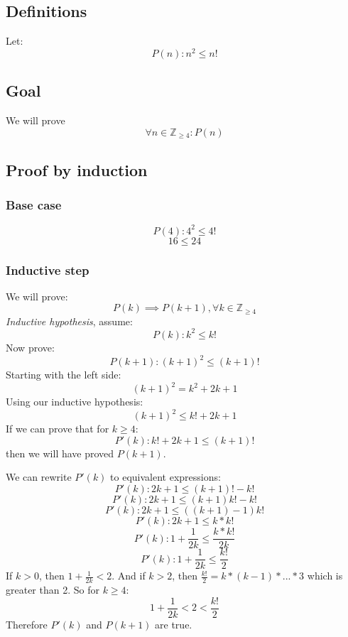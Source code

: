 \documentclass{article}
\begin{document}
\subsection{Definitions}
Let:
\begin{equation}
P(n): n^2 \leq n!
\end{equation}

\subsection{Goal}
We will prove
\begin{equation}
\forall n \in \mathbb Z_{\geq 4} : P(n)
\end{equation}

\subsection{Proof by induction}
\subsubsection{Base case}
\begin{equation}
P(4): 4^2 \leq 4!
\end{equation}
\[ 16 \leq 24 \]

\subsubsection{Inductive step}
We will prove:
\begin{equation}
P(k) \implies P(k + 1), \forall k \in \mathbb Z_{\geq 4}
\end{equation}
\textit{Inductive hypothesis}, assume:
\begin{equation}
P(k): k^2 \leq k!
\end{equation}
Now prove:
\begin{equation}
P(k + 1): (k + 1)^2 \leq (k + 1)!
\end{equation}
Starting with the left side:
\[ (k + 1)^2 = k^2 + 2k + 1 \]
Using our inductive hypothesis:
\[ (k + 1)^2 \leq k! + 2k + 1 \]
If we can prove that for $k \geq 4$:
\[ P'(k): k! + 2k + 1 \leq (k + 1)! \]
then we will have proved $P(k + 1)$.

We can rewrite $P'(k)$ to equivalent expressions:
\[ P'(k): 2k + 1 \leq (k + 1)! - k! \]
\[ P'(k): 2k + 1 \leq (k + 1)k! - k! \]
\[ P'(k): 2k + 1 \leq ((k + 1) - 1)k! \]
\[ P'(k): 2k + 1 \leq k * k! \]
\[ P'(k): 1 + \frac{1}{2k} \leq \frac{k * k!}{2k} \]
\[ P'(k): 1 + \frac{1}{2k} \leq \frac{k!}{2} \]
If $k > 0$, then $1 + \frac{1}{2k} < 2$. And if $k > 2$, then $\frac{k!}{2} = k * (k - 1) * ... * 3$ which is greater than 2. So for $k \geq 4$:
\[ 1 + \frac{1}{2k} < 2 < \frac{k!}{2} \]
Therefore $P'(k)$ and $P(k + 1)$ are true.
\end{document}

